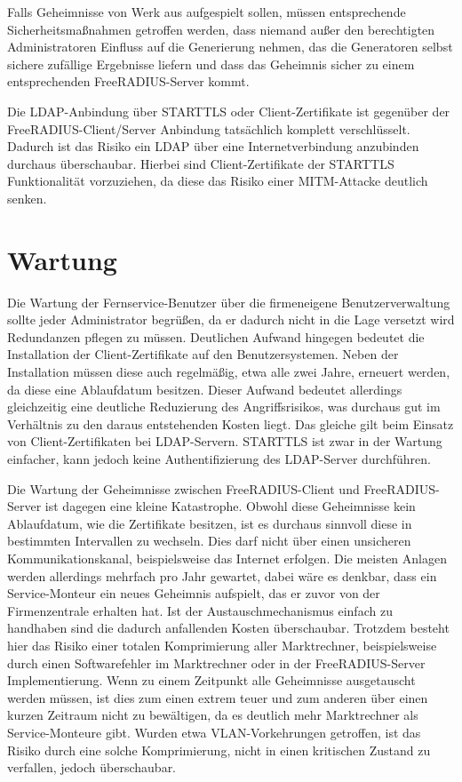 \documentclass[11pt,a4paper]{report}
\begin{document}
Falls Geheimnisse von Werk aus aufgespielt sollen, müssen entsprechende Sicherheitsmaßnahmen getroffen werden, dass niemand außer den berechtigten Administratoren Einfluss auf die Generierung nehmen, das die Generatoren selbst sichere zufällige Ergebnisse liefern und dass das Geheimnis sicher zu einem entsprechenden FreeRADIUS-Server kommt.

Die LDAP-Anbindung über STARTTLS oder Client-Zertifikate ist gegenüber der FreeRADIUS-Client/Server Anbindung tatsächlich komplett verschlüsselt. Dadurch ist das Risiko ein LDAP über eine Internetverbindung anzubinden durchaus überschaubar. Hierbei sind Client-Zertifikate der STARTTLS Funktionalität vorzuziehen, da diese das Risiko einer MITM-Attacke deutlich senken.

\section{Wartung}

Die Wartung der Fernservice-Benutzer über die firmeneigene Benutzerverwaltung sollte jeder Administrator begrüßen, da er dadurch nicht in die Lage versetzt wird Redundanzen pflegen zu müssen. Deutlichen Aufwand hingegen bedeutet die Installation der Client-Zertifikate auf den Benutzersystemen. Neben der Installation müssen diese auch regelmäßig, etwa alle zwei Jahre, erneuert werden, da diese eine Ablaufdatum besitzen. Dieser Aufwand bedeutet allerdings gleichzeitig eine deutliche Reduzierung des Angriffsrisikos, was durchaus gut im Verhältnis zu den daraus entstehenden Kosten liegt. Das gleiche gilt beim Einsatz von Client-Zertifikaten bei LDAP-Servern. STARTTLS ist zwar in der Wartung einfacher, kann jedoch keine Authentifizierung des LDAP-Server durchführen. 

Die Wartung der Geheimnisse zwischen FreeRADIUS-Client und FreeRADIUS-Server ist dagegen eine kleine Katastrophe. Obwohl diese Geheimnisse kein Ablaufdatum, wie die Zertifikate besitzen, ist es durchaus sinnvoll diese in bestimmten Intervallen zu wechseln. Dies darf nicht über einen unsicheren Kommunikationskanal, beispielsweise das Internet erfolgen. Die meisten Anlagen werden allerdings mehrfach pro Jahr gewartet, dabei wäre es denkbar, dass ein Service-Monteur ein neues Geheimnis aufspielt, das er zuvor von der Firmenzentrale erhalten hat. Ist der Austauschmechanismus einfach zu handhaben sind die dadurch anfallenden Kosten überschaubar. Trotzdem besteht hier das Risiko einer totalen Komprimierung aller Marktrechner, beispielsweise durch einen Softwarefehler im Marktrechner oder in der FreeRADIUS-Server Implementierung. Wenn zu einem Zeitpunkt alle Geheimnisse ausgetauscht werden müssen, ist dies zum einen extrem teuer und zum anderen über einen kurzen Zeitraum nicht zu bewältigen, da es deutlich mehr Marktrechner als Service-Monteure gibt. Wurden etwa VLAN-Vorkehrungen getroffen, ist das Risiko durch eine solche Komprimierung, nicht in einen kritischen Zustand zu verfallen, jedoch überschaubar.
\end{document}
